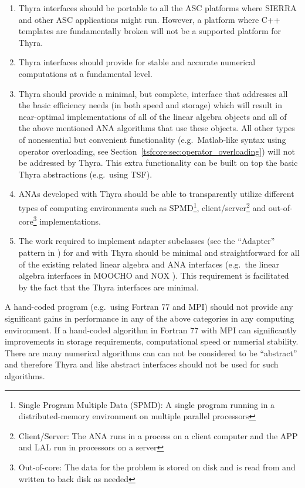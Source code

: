 \documentclass[pdf,ps2pdf,11pt]{SANDreport}
\begin{document}
\begin{enumerate}

\item
Thyra interfaces should be portable to all the ASC
{}\cite{ref:doe_asci} platforms where SIERRA {}\cite{ref:SIERRA} and
other ASC applications might run.  However, a platform where C++
templates are fundamentally broken will not be a supported platform
for Thyra.

\item
Thyra interfaces should provide for stable and accurate numerical
computations at a fundamental level.

\item
Thyra should provide a minimal, but complete, interface that
addresses all the basic efficiency needs (in both speed and storage)
which will result in near-optimal implementations of all of the linear
algebra objects and all of the above mentioned ANA algorithms that use
these objects.  All other types of nonessential but convenient
functionality (e.g.~Matlab-like syntax using operator overloading, see
Section~\ref{tsfcore:sec:operator_overloading}) will not be
addressed by Thyra.  This extra functionality can be built on top
the basic Thyra abstractions (e.g.~using TSF).

\item
ANAs developed with Thyra should be able to transparently utilize
different types of computing environments such as SPMD\footnote{Single
Program Multiple Data (SPMD): A single program running in a
distributed-memory environment on multiple parallel processors},
client/server\footnote{Client/Server: The ANA runs in a process on a
client computer and the APP and LAL run in processors on a server} and
out-of-core\footnote{Out-of-core: The data for the problem is stored
on disk and is read from and written to back disk as needed}
implementations.

\item
The work required to implement adapter subclasses (see the ``Adapter''
pattern in {}\cite{ref:gama_et_al_1995}) for and with Thyra should
be minimal and straightforward for all of the existing related linear
algebra and ANA interfaces (e.g.~the linear algebra interfaces in
MOOCHO {}\cite{ref:moochouserguide} and NOX {}\cite{ref:nox}).  This
requirement is facilitated by the fact that the Thyra interfaces are
minimal.

\end{enumerate}

A hand-coded program (e.g.~using Fortran 77 and MPI) should not
provide any significant gains in performance in any of the above
categories in any computing environment.  If a hand-coded algorithm in
Fortran 77 with MPI can significantly improvements in storage
requirements, computational speed or numerial stability.  There are
many numerical algorithms can can not be considered to be ``abstract''
and therefore Thyra and like abstract interfaces should not be used
for such algorithms.
\end{document}
